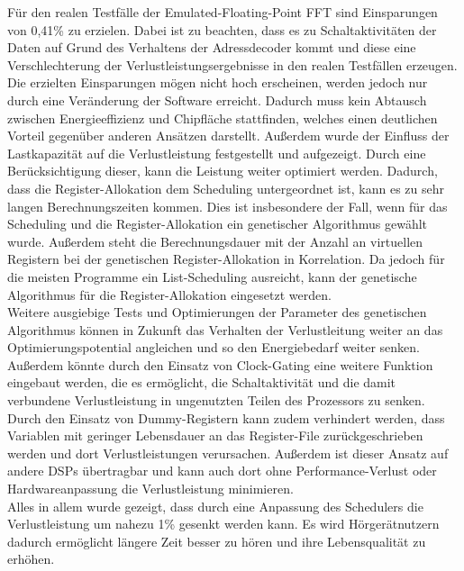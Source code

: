 Für den realen Testfälle der Emulated-Floating-Point FFT sind Einsparungen von 0,41\% zu erzielen. Dabei ist zu beachten, dass es zu Schaltaktivitäten der Daten auf Grund des Verhaltens der Adressdecoder kommt und diese eine Verschlechterung der Verlustleistungsergebnisse in den realen Testfällen erzeugen.
Die erzielten Einsparungen mögen nicht hoch erscheinen, werden jedoch nur durch eine Veränderung der Software erreicht. Dadurch muss kein Abtausch zwischen Energieeffizienz und Chipfläche stattfinden, welches einen deutlichen Vorteil gegenüber anderen Ansätzen darstellt.
Außerdem wurde der Einfluss der Lastkapazität auf die Verlustleistung festgestellt und aufgezeigt. Durch eine Berücksichtigung dieser, kann die Leistung weiter optimiert werden.
Dadurch, dass die Register-Allokation dem Scheduling untergeordnet ist, kann es zu sehr langen Berechnungszeiten kommen. Dies ist insbesondere der Fall, wenn für das Scheduling und die Register-Allokation ein genetischer Algorithmus gewählt wurde. Außerdem steht die Berechnungsdauer mit der Anzahl an virtuellen Registern bei der genetischen Register-Allokation in Korrelation. Da jedoch für die meisten Programme ein List-Scheduling ausreicht, kann der genetische Algorithmus für die Register-Allokation eingesetzt werden.\\
Weitere ausgiebige Tests und Optimierungen der Parameter des genetischen Algorithmus können in Zukunft das Verhalten der Verlustleitung weiter an das Optimierungspotential angleichen und so den Energiebedarf weiter senken. Außerdem könnte durch den Einsatz von Clock-Gating eine weitere Funktion eingebaut werden, die es ermöglicht, die Schaltaktivität und die damit verbundene Verlustleistung in ungenutzten Teilen des Prozessors zu senken. Durch den Einsatz von Dummy-Registern kann zudem verhindert werden, dass Variablen mit geringer Lebensdauer an das Register-File zurückgeschrieben werden und dort Verlustleistungen verursachen. Außerdem ist dieser Ansatz auf andere DSPs übertragbar und kann auch dort ohne Performance-Verlust oder Hardwareanpassung die Verlustleistung minimieren.\\
Alles in allem wurde gezeigt, dass durch eine Anpassung des Schedulers die Verlustleistung um nahezu 1\% gesenkt werden kann. Es wird Hörgerätnutzern dadurch ermöglicht längere Zeit besser zu hören und ihre Lebensqualität zu erhöhen.\\
%


